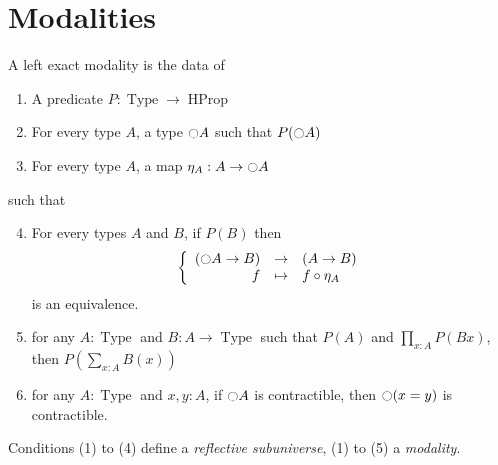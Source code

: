 \documentclass[notfinal]{jfrarticle}
\makeatletter
\def\dar[#1]#2{\ar@<-#2>[#1]\ar@<#2>[#1]} %
\def\tar[#1]#2{\ar@<#2>[#1]\ar@<0pt>[#1]\ar@<-#2>[#1]} %
\DeclareMathOperator{\Type}{Type}
\DeclareMathOperator{\HProp}{HProp}
\newcommand{\modal}{\ensuremath{\ocircle}}
\makeatother
\begin{document}





\section{Modalities}
\label{sec:modalities}

\begin{defi}
  \label{def:modality}
  A left exact modality is the data of
  \begin{enumerate}
  \item A predicate $P:\Type \to \HProp$
  \item For every type $A$, a type
    $\modal A$ such that $P(\modal A)$
  \item For every type $A$, a map $\eta_A:A \to
    \modal A$
  \end{enumerate}
  such that
  \begin{enumerate}
    \setcounter{enumi}{3}
  \item For every types $A$ and $B$, if $P(B)$ then
    \[ \left\{
        \begin{array}{rcl}
          (\modal A \to B) & \to & (A \to B) \\
          f & \mapsto & f \circ \eta_A
        \end{array} \right. \] %
    is an equivalence.
  \item for any $A:\Type$ and $B:A \to \Type$ such that $P(A)$
    and $\prod_{x:A} P(B x)$, then $P\left( \sum_{x:A} B(x)\right)$
  \item for any $A:\Type$ and $x,y:A$, if $\modal A$ is
    contractible, then $\modal (x=y)$ is contractible.
  \end{enumerate}
  Conditions (1) to (4) define a {\em reflective subuniverse}, (1) to
  (5) a {\em modality}.
\end{defi}
\end{document}
